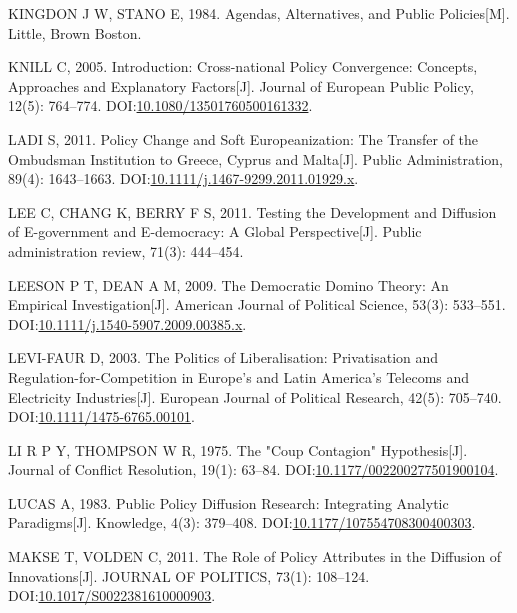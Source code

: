 \documentclass[
  12pt,
]{ctexart}
\newlength{\cslhangindent}
\newlength{\cslentryspacingunit} %
\newenvironment{CSLReferences}[2] %
 {%
  \setlength{\parindent}{0pt}
  \ifodd #1
  \let\oldpar\par
  \def\par{\hangindent=\cslhangindent\oldpar}
  \fi
  \setlength{\parskip}{#2\cslentryspacingunit}
 }%
 {}
\begin{document}
\begin{CSLReferences}{1}{0}
\leavevmode{}%
KINGDON J W, STANO E, 1984. Agendas, Alternatives, and Public Policies{[}M{]}. {Little, Brown Boston}.

\leavevmode{}%
KNILL C, 2005. Introduction: {Cross-national} Policy Convergence: Concepts, Approaches and Explanatory Factors{[}J{]}. Journal of European Public Policy, 12(5): 764--774. DOI:\href{https://doi.org/10.1080/13501760500161332}{10.1080/13501760500161332}.

\leavevmode{}%
LADI S, 2011. Policy {Change} and {Soft Europeanization}: {The Transfer} of the {Ombudsman Institution} to {Greece}, {Cyprus} and {Malta}{[}J{]}. Public Administration, 89(4): 1643--1663. DOI:\href{https://doi.org/10.1111/j.1467-9299.2011.01929.x}{10.1111/j.1467-9299.2011.01929.x}.

\leavevmode{}%
LEE C, CHANG K, BERRY F S, 2011. Testing the Development and Diffusion of E-government and E-democracy: {A} Global Perspective{[}J{]}. Public administration review, 71(3): 444--454.

\leavevmode{}%
LEESON P T, DEAN A M, 2009. The {Democratic Domino Theory}: {An Empirical Investigation}{[}J{]}. American Journal of Political Science, 53(3): 533--551. DOI:\href{https://doi.org/10.1111/j.1540-5907.2009.00385.x}{10.1111/j.1540-5907.2009.00385.x}.

\leavevmode{}%
LEVI-FAUR D, 2003. The Politics of Liberalisation: {Privatisation} and Regulation-for-Competition in {Europe}'s and {Latin America}'s Telecoms and Electricity Industries{[}J{]}. European Journal of Political Research, 42(5): 705--740. DOI:\href{https://doi.org/10.1111/1475-6765.00101}{10.1111/1475-6765.00101}.

\leavevmode{}%
LI R P Y, THOMPSON W R, 1975. The "{Coup Contagion}" {Hypothesis}{[}J{]}. Journal of Conflict Resolution, 19(1): 63--84. DOI:\href{https://doi.org/10.1177/002200277501900104}{10.1177/002200277501900104}.

\leavevmode{}%
LUCAS A, 1983. Public {Policy Diffusion Research}: {Integrating Analytic Paradigms}{[}J{]}. Knowledge, 4(3): 379--408. DOI:\href{https://doi.org/10.1177/107554708300400303}{10.1177/107554708300400303}.

\leavevmode{}%
MAKSE T, VOLDEN C, 2011. The {Role} of {Policy Attributes} in the {Diffusion} of {Innovations}{[}J{]}. JOURNAL OF POLITICS, 73(1): 108--124. DOI:\href{https://doi.org/10.1017/S0022381610000903}{10.1017/S0022381610000903}.


\end{CSLReferences}
\end{document}

